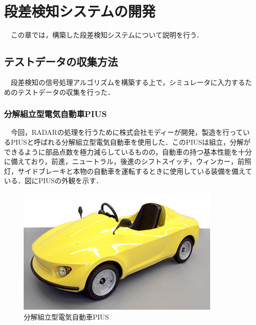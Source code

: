 \chapter{段差検知システムの開発}
　この章では，構築した段差検知システムについて説明を行う．

\section{テストデータの収集方法}
　段差検知の信号処理アルゴリズムを構築する上で，シミュレータに入力するためのテストデータの収集を行った．

\subsection{分解組立型電気自動車PIUS}
　今回，RADARの処理を行うために株式会社モディーが開発，製造を行っているPIUSと呼ばれる分解組立型電気自動車を使用した．このPIUSは組立，分解ができるように部品点数を極力減らしているものの，自動車の持つ基本性能を十分に備えており，前進，ニュートラル，後進のシフトスイッチ，ウィンカー，前照灯，サイドブレーキと本物の自動車を運転するときに使用している装備を備えている\cite{PIUS}．図にPIUSの外観を示す．
\begin{figure}[H]
    \centering
    \includegraphics[width=10cm]{./fig/PIUS.png}
    \caption{分解組立型電気自動車PIUS\cite{PIUS}}
    \label{fig:PIUS}
\end{figure}

